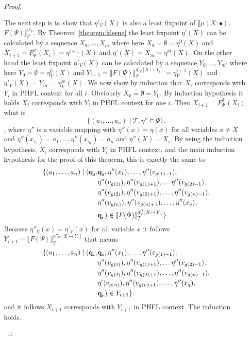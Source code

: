 \begin{proof}
\begin{compactitem}
        The next step is to show that $\eta'_V(X)$ is also a least fixpoint of $\llbracket
         \mu(X\colon \bullet).\,$ $F(\Psi) \rrbracket^{\eta'_V}_\mathcal{T}$. By Theorem~\ref{theorem:kleene} the least fixpoint $\eta'(X)$ can be calculated by a sequence $X_0, \dots, X_m
         $ where here $X_0 = \emptyset = \eta^0(X)$ and $X_{i+1} = F_\Psi^\mathcal{T}(X_i) = \eta^{i+1}(X)$ and $\eta'(X) = X_m = \eta^m(X)$. On the other hand the least fixpoint $\eta'_V(X)$ can be calculated by a sequence 
         $Y_0, \dots, Y_{m'}$ where here $Y_0 = \emptyset = \eta^0_V(X)$ and $Y_{i+1} = \llbracket F(\Psi)\rrbracket_\mathcal{T}^{\eta'_V[X \mapsto Y_i]} = \eta^{i+1}_V(X)$ and $\eta'_V(X) = Y_{m'} = \eta^m_V(X)$. We now show by induction that $X_i$ corresponds with $Y_i$ in PHFL context for all $i$. Obviously $X_0 = \emptyset = Y_0$. By induction hypothesis it holds $X_i$ corresponds with $Y_i$ in PHFL context for 
         one $i$. Then $X_{i+1} = F_\Psi^\mathcal{T}(X_i)$ what is
         \[\{(a_1, \dots, a_n) \mid \mathcal{T}, \eta'' \models \Psi\}.\] 
         , where $\eta''$ is a variable mapping with $\eta''(x) = \eta(x)$ for all variables $x \neq X$ and $\eta''(x_{i_1}) = a_1, \dots,  \eta''(x_{i_n}) = a_n$ and $\eta''(X) = X_i$. 
         By using the induction hypothesis, $X_i$ corresponds with $Y_i$ in PHFL context, and the main induction hypothesis for the proof of this theorem, this is exactly the same to
                 \begin{align*}
                 \{(a_1, \dots, a_n) \mid 
        (\emph{q}_s, &\emph{q}_s, \eta''(x_1), \dots, \eta''(v_{g(1)-1}),\\& \eta''(v_{g(1)}), \eta''(v_{g(1)+1}), \dots \eta''(v_{g(2)-1}),\\& \eta''
            (v_{g(2)}), \eta''(v_{g(2)+1}), \dots, \eta''(v_{g(n)-1}), \\&\eta''(v_{g(n)}), \eta''(v_{g(n)+1}), \dots, \eta''
            (x_q), \\& \emph{q}_r) \in \llbracket
        F(\Psi) \rrbracket^{\eta''_V[X\mapsto Y_i]}_\mathcal{T}\}
        \end{align*}
		Because $\eta''_V(x) = \eta'_V(x)$ for all variable $x$ it follows $Y_{i+1} = \llbracket F(\Psi)\rrbracket_\mathcal{T}^{\eta''_V[X \mapsto Y_i]}$ that means        
        \begin{align*}
                 \{(a_1, \dots, a_n) \mid 
        (\emph{q}_s, &\emph{q}_s, \eta''(x_1), \dots, \eta''(v_{g(1)-1}),\\& \eta''(v_{g(1)}), \eta''(v_{g(1)+1}), \dots \eta''(v_{g(2)-1}),\\& \eta''
            (v_{g(2)}), \eta''(v_{g(2)+1}), \dots, \eta''(v_{g(n)-1}), \\&\eta'(v_{g(n)}), \eta''(v_{g(n)+1}), \dots, \eta''
            (x_q), \\& \emph{q}_r) \in Y_{i+1}\}.
        \end{align*}
         and it follows $X_{i+1}$ corresponds with $Y_{i+1}$ in PHFL context. The induction holds.
        

\end{compactitem}
\end{proof}
